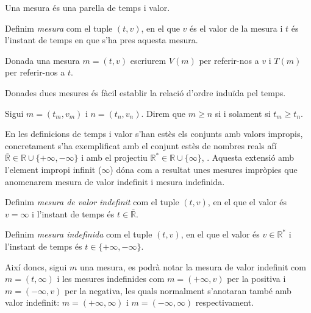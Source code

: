 Una mesura és una parella de temps i valor.

\begin{definition}[Mesura]
  \label{def:model:mesura}
  Definim \emph{mesura} com el tuple $(t,v)$, en el que $v$ és el
  valor de la mesura i $t$ és l'instant de temps en que s'ha pres
  aquesta mesura.
\end{definition}


Donada una mesura $m=(t,v)$ escriurem $V(m)$ per referir-nos a $v$ i
$T(m)$ per referir-nos a $t$.

Donades dues mesures és fàcil establir la relació d'ordre induïda pel
temps.

\begin{definition}
  \label{def:model:mesura-relacio-ordre}
  Sigui $m=(t_m,v_m)$ i $n=(t_n,v_n)$. Direm que $m\geq n$ si i solament
  si $t_m\geq t_n$.
\end{definition}


En les definicions de temps i valor s'han estès els conjunts amb
valors impropis, concretament s'ha exemplificat amb el conjunt estès
de nombres reals afí $\bar{\mathbb{R}} \in \mathbb{R} \cup
\{+\infty,-\infty\}$ i amb el projectiu $\mathbb{R}^*\in\mathbb{R}
\cup\{\infty\}$,
\parencite{cantrell:extendedreal,cantrell:projectivelyextendedreal}. Aquesta
extensió amb l'element impropi infinit ($\infty$) dóna com a resultat
unes mesures impròpies que anomenarem mesura de valor indefinit i
mesura indefinida.

\begin{definition}
  \label{def:model:mesura_valor_indefinit}
  Definim \emph{mesura de valor indefinit} com el tuple $(t,v)$, en el
  que el valor és $v=\infty$ i l'instant de temps és
  $t\in\bar{\mathbb{R}}$.
\end{definition}

\begin{definition}
  \label{def:model:mesura_indefinida}
  Definim \emph{mesura indefinida} com el tuple $(t,v)$, en el que el
  valor és $v\in\mathbb{R}^*$ i l'instant de temps és
  $t\in\{+\infty,-\infty\}$.
\end{definition}

Així doncs, sigui $m$ una mesura, es podrà notar la mesura de valor
indefinit com $m=(t,\infty)$ i les mesures indefinides com
$m=(+\infty,v)$ per la positiva i $m=(-\infty,v)$ per la negativa, les
quals normalment s'anotaran també amb valor indefinit:
$m=(+\infty,\infty)$ i $m=(-\infty,\infty)$ respectivament.


